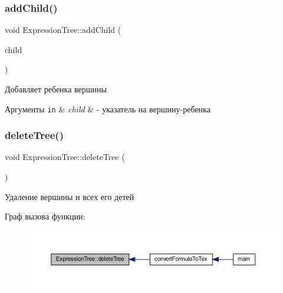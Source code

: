 \subsubsection{\texorpdfstring{add\+Child()}{addChild()}\hspace{0.1cm}{\footnotesize\ttfamily [2/2]}}
{\footnotesize\ttfamily void Expression\+Tree\+::add\+Child (\begin{DoxyParamCaption}\item[{\mbox{\hyperlink{class_expression_tree}{Expression\+Tree}} $\ast$}]{child }\end{DoxyParamCaption})}



Добавляет ребенка вершины 


\begin{DoxyParams}[1]{Аргументы}
\mbox{\tt in}  & {\em child} & -\/ указатель на вершину-\/ребенка \\
\hline
\end{DoxyParams}
\mbox{\label{class_expression_tree_a31b2699bd59541d9620fd0fbbdb1e994}} 
\subsubsection{\texorpdfstring{delete\+Tree()}{deleteTree()}}
{\footnotesize\ttfamily void Expression\+Tree\+::delete\+Tree (\begin{DoxyParamCaption}{ }\end{DoxyParamCaption})}



Удаление вершины и всех его детей 

Граф вызова функции\+:\nopagebreak
\begin{figure}[H]
\begin{center}
\leavevmode
\includegraphics[width=350pt]{class_expression_tree_a31b2699bd59541d9620fd0fbbdb1e994_icgraph}
\end{center}
\end{figure}
\mbox{\label{class_expression_tree_a43f4d0121efe31c0258e5932007b928e}} 
